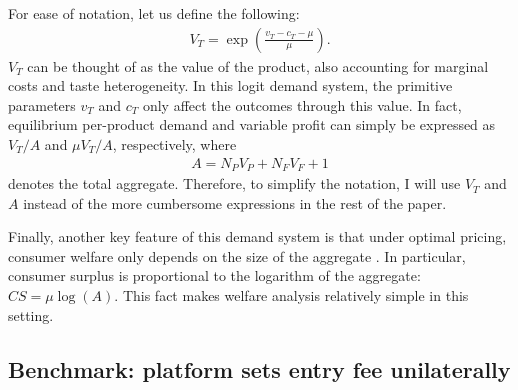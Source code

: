 For ease of notation, let us define the following:
\begin{align*}
    V_T = \exp \left( \frac{v_T - c_T - \mu}{\mu} \right).
\end{align*}
$V_T$ can be thought of as the value of the product, also accounting for marginal costs and taste heterogeneity.
In this logit demand system, the primitive parameters $v_T$ and $c_T$ only affect the outcomes through this value.
In fact, equilibrium per-product demand and variable profit can simply be expressed as $V_T/ A$ and $\mu V_T/ A$, respectively, where
\begin{align}
    A = N_P V_P + N_F V_F + 1
    \label{eq:aggregate_simple}
\end{align}
denotes the total aggregate.
Therefore, to simplify the notation, I will use $V_T$ and $A$ instead of the more cumbersome expressions in the rest of the paper.

Finally, another key feature of this demand system is that under optimal pricing, consumer welfare only depends on the size of the aggregate \parencite{anderson2020aggregative}.
In particular, consumer surplus is proportional to the logarithm of the aggregate: $CS = \mu \log(A)$. This fact makes welfare analysis relatively simple in this setting.

\subsection{Benchmark: platform sets entry fee unilaterally}
\label{sec:results_benchmark}

